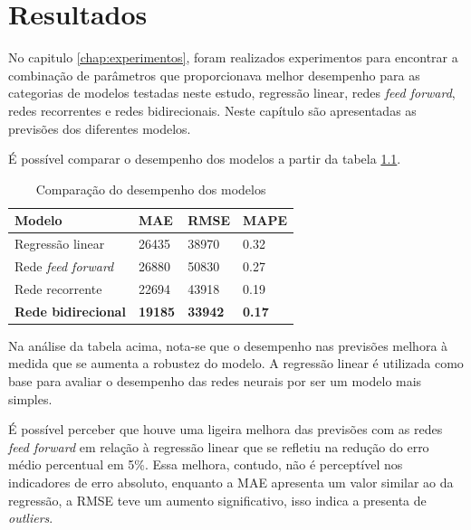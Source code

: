 
\chapter{Resultados}
\label{chap:resultados}

No capitulo \ref{chap:experimentos}, foram realizados experimentos para encontrar a combinação de 
parâmetros que proporcionava melhor desempenho para as categorias de modelos 
testadas neste estudo, regressão linear, redes \textit{feed forward}, redes
recorrentes e redes bidirecionais. Neste capítulo são apresentadas as previsões 
dos diferentes modelos.

É possível comparar o desempenho dos modelos a partir da tabela \ref{tab:compara_modelos}.

\begin{table}[H]
    \centering
    \begin{tabular}{llll}
        \toprule
        Modelo & MAE     & RMSE    & MAPE \\
        \midrule
        Regressão linear & 26435 & 38970 & 0.32  \\
        Rede \textit{feed forward} & 26880  & 50830 & 0.27 \\
        Rede recorrente & 22694 & 43918 & 0.19  \\
        \textbf{Rede bidirecional} & \textbf{19185} & \textbf{33942} & \textbf{0.17} \\
        \bottomrule
    \end{tabular}
    \caption{Comparação do desempenho dos modelos}
    \label{tab:compara_modelos}
\end{table}

Na análise da tabela acima, nota-se que o desempenho nas previsões
melhora à medida que se aumenta a robustez do modelo. A regressão linear é utilizada 
como base para avaliar o desempenho das redes neurais por ser um modelo mais 
simples. 

É possível perceber que houve uma ligeira melhora das previsões com as 
redes \textit{feed forward} em relação à regressão linear que se refletiu na 
redução do erro médio percentual
em 5\%. Essa melhora, contudo, não é perceptível nos indicadores de erro absoluto,
enquanto a MAE apresenta um valor similar ao da regressão, a RMSE teve um 
aumento significativo, isso indica a presenta de \textit{outliers}.

